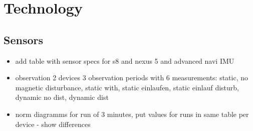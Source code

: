 \documentclass[review]{elsarticle}
\begin{document}

\section{Technology}
\label{sec:technology}

\subsection{Sensors}
\label{sec:technology:sensors}

\begin{itemize}
\item add table with sensor specs for s8 and nexus 5 and advanced navi IMU
\item observation 2 devices 3 observation periods with 6 measurements: static, no magnetic disturbance, static with, static einlaufen, static einlauf disturb, dynamic no dist, dynamic dist
\item norm diagramms for run of 3 minutes, put values for runs in same table per device - show differences
\end{itemize}
\end{document}
